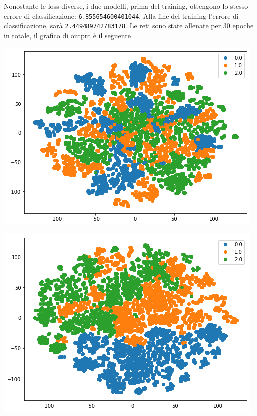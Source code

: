 \documentclass[11pt]{article}
\begin{document}
Nonostante le loss diverse, i due modelli, prima del training, ottengono lo stesso errore di classificazione: \texttt{6.855654600401044}. 
Alla fine del training l'errore di classificazione, sarà \texttt{2.449489742783178}. Le reti sono state allenate per 30 epoche in totale, il grafico di output è il seguente





\begin{center}
\begin{minipage}{0.48\linewidth}
\includegraphics[width=\linewidth]{output_squeezeNet_v1_0epoch.png}
\end{minipage}%
\begin{minipage}{0.49\linewidth}
\includegraphics[width=\linewidth]{output_squeezeNet_v1_10epoch.png}

\end{minipage}
\end{center}
\end{document}
